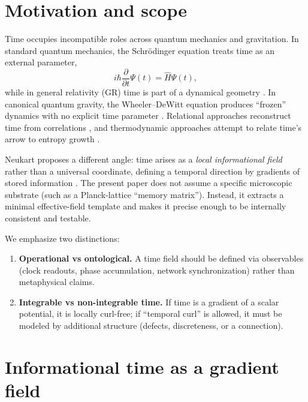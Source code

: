 \documentclass[11pt]{article}
\begin{document}
    \section{Motivation and scope}
        Time occupies incompatible roles across quantum mechanics and gravitation. In standard quantum mechanics, the Schr\"odinger equation treats time as an external parameter,
        \begin{equation}
            i\hbar \frac{\partial}{\partial t}\Psi(t)=\hat H \Psi(t),
            \label{eq:schro}
        \end{equation}
        while in general relativity (GR) time is part of a dynamical geometry \cite{Wald1984_GR}. In canonical quantum gravity, the Wheeler--DeWitt equation produces ``frozen'' dynamics with no explicit time parameter \cite{DeWitt1967_Canonical,Isham1993_ProblemTime,Kuchar1992_TimeInterp}. Relational approaches reconstruct time from correlations \cite{PageWootters1983_Evolution,Rovelli1991_TimeHypothesis}, and thermodynamic approaches attempt to relate time's arrow to entropy growth \cite{Lebowitz1993_Boltzmann,ConnesRovelli1994_ThermalTime}.

        Neukart proposes a different angle: time arises as a \emph{local informational field} rather than a universal coordinate, defining a temporal direction by gradients of stored information \cite{Neukart2026_InfoTime}. The present paper does not assume a specific microscopic substrate (such as a Planck-lattice ``memory matrix''). Instead, it extracts a minimal effective-field template and makes it precise enough to be internally consistent and testable.

        We emphasize two distinctions:
        \begin{enumerate}[label=(\roman*)]
\item \textbf{Operational vs ontological.} A time field should be defined via observables (clock readouts, phase accumulation, network synchronization) rather than metaphysical claims.
\item \textbf{Integrable vs non-integrable time.} If time is a gradient of a scalar potential, it is locally curl-free; if ``temporal curl'' is allowed, it must be modeled by additional structure (defects, discreteness, or a connection).
        \end{enumerate}

    \section{Informational time as a gradient field}
\end{document}
